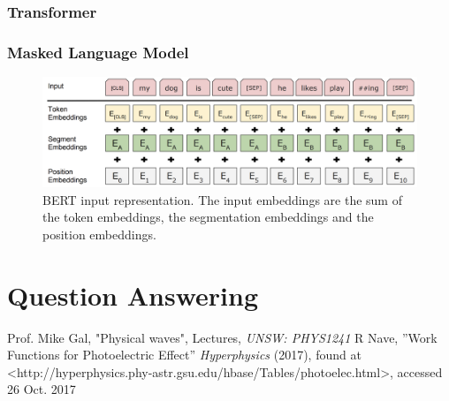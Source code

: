 \documentclass[paper=a4, fontsize=12pt]{scrartcl}
\begin{document}
\subsubsection{Transformer}
\subsubsection{Masked Language Model}
 \begin{figure}
  \includegraphics[scale=0.53]{bertinput.png}
  \caption{BERT input representation. The input embeddings are the sum of the token embeddings, the segmentation embeddings and the position embeddings.}
  \label{fig:skip-gram}
\end{figure}
\section{Question Answering}




\clearpage

\begin{thebibliography}{99}
 Prof. Mike Gal, "Physical waves", Lectures, {\em UNSW: PHYS1241}
 R Nave, ''Work Functions for Photoelectric Effect'' {\em Hyperphysics} (2017), found at <http://hyperphysics.phy-astr.gsu.edu/hbase/Tables/photoelec.html>, accessed 26 Oct. 2017

\end{thebibliography}
\end{document}
